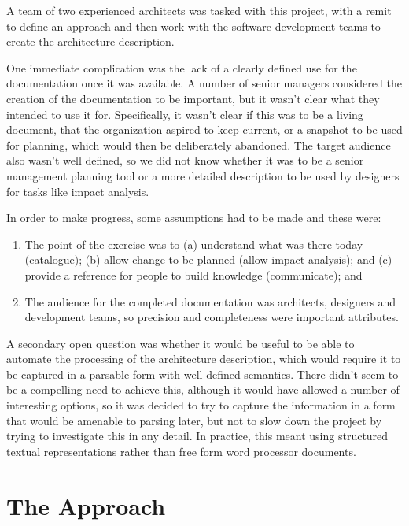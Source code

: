   A team of two experienced architects was tasked with this project, with a remit to define an approach and then work with the software development teams to create the architecture description.

  One immediate complication was the lack of a clearly defined use for the documentation once it was available. A number of senior managers considered the creation of the documentation to be important, but it wasn't clear what they intended to use it for.  Specifically, it wasn't clear if this was to be a living document, that the organization aspired to keep current, or a snapshot to be used for planning, which would then be deliberately abandoned.  The target audience also wasn't well defined, so we did not know whether it was to be a senior management planning tool or a more detailed description to be used by designers for tasks like impact analysis. 

  In order to make progress, some assumptions had to be made and these were:

 \begin{enumerate}

\item The point of the exercise was to (a) understand what was there today (catalogue); (b) allow change to be planned (allow impact analysis); and (c) provide a reference for people to build knowledge (communicate); and

\item The audience for the completed documentation was architects, designers and development teams, so precision and completeness were important attributes.

\end{enumerate}

  A secondary open question was whether it would be useful to be able to automate the processing of the architecture description, which would require it to be captured in a parsable form with well-defined semantics.  There didn't seem to be a compelling need to achieve this, although it would have allowed a number of interesting options, so it was decided to try to capture the information in a form that would be amenable to parsing later, but not to slow down the project by trying to investigate this in any detail.  In practice, this meant using structured textual representations rather than free form word processor documents.


\section{The Approach}

